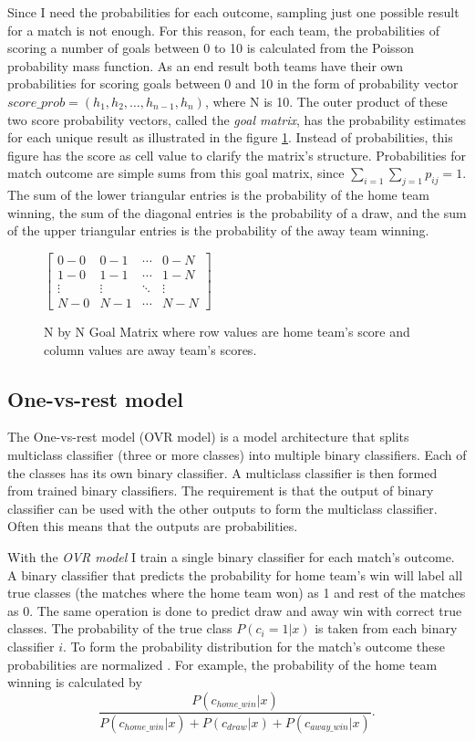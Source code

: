 Since I need the probabilities for each outcome, sampling just one possible result for a match is not enough. For this reason, for each team, the probabilities of scoring a number of goals between 0 to 10 is calculated from the Poisson probability mass function. As an end result both teams have their own probabilities for scoring goals between 0 and 10 in the form of probability vector $score\_prob = \left( h _ { 1 } , h _ { 2 } , \dots , h _ { n - 1 } , h _ { n } \right)$, where N is 10. The outer product of these two score probability vectors, called the \textit{goal matrix}, has the probability estimates for each unique result as illustrated in the figure \ref{fig:goal_matrix}. Instead of probabilities, this figure has the score as cell value to clarify the matrix's structure. Probabilities for match outcome are simple sums from this goal matrix, since $\sum_{i=1}\sum_{j=1}p_{ij} = 1$. The sum of the lower triangular entries is the probability of the home team winning, the sum of the diagonal entries is the probability of a draw, and the sum of the upper triangular entries is the probability of the away team winning.
\begin{figure}
    $\begin{bmatrix}
    0-0 & 0-1 & \cdots & 0-N \\
    1-0 & 1-1 & \cdots   &1-N \\
    \vdots & \vdots   & \ddots & \vdots \\
    N-0 & N-1 & \cdots & N-N\end{bmatrix}$
\caption{N by N Goal Matrix where row values are home team's score and column values are away team's scores.}
\label{fig:goal_matrix}
\end{figure}

\subsection{One-vs-rest model}
The One-vs-rest model (OVR model) is a model architecture that splits multiclass classifier (three or more classes) into multiple binary classifiers. Each of the classes has its own binary classifier. A multiclass classifier is then formed from trained binary classifiers. The requirement is that the output of binary classifier can be used with the other outputs to form the multiclass classifier. Often this means that the outputs are probabilities.

With the \textit{OVR model} I train a single binary classifier for each match's outcome. A binary classifier that predicts the probability for home team's win will label all true classes (the matches where the home team won) as 1 and rest of the matches as 0. The same operation is done to predict draw and away win with correct true classes. The probability of the true class $P(c_i = 1 | x)$ is taken from each binary classifier $i$. To form the probability distribution for the match's outcome these probabilities are normalized \cite{zadrozny2002transforming}. For example, the probability of the home team winning is calculated by
\begin{equation}
\frac{P(c_{home\_win}| x)}{P(c_{home\_win}| x) + P(c_{draw}| x) + P(c_{away\_win}| x)} \text{.}
\end{equation}


